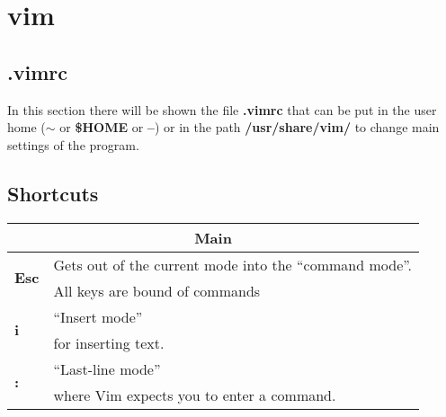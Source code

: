 \chapter{vim}
\section{.vimrc}
In this section there will be shown the file \textbf{.vimrc} that can be put in the user home (\textbf{$\sim$} or \textbf{\$HOME} or \textbf{--}) or in the path \textbf{/usr/share/vim/} to change main settings of the program.



\section{Shortcuts}

\begin{table}[h]
\centering
\footnotesize
\begin{tabular}{|l|l|}
\multicolumn{2}{c}{\textbf{Main}}\\
\hline
\multirow{2}{*}{\textbf{Esc}} & {Gets out of the current mode into the “command mode”.}\\
& {All keys are bound of commands}\\
\hline
\multirow{2}{*}{\textbf{i}} & {“Insert mode”}\\
& {for inserting text.}\\ 
\hline
\multirow{2}{*}{\textbf{:}} & {“Last-line mode”}\\ 
& {where Vim expects you to enter a command.}\\ 
\hline
\end{tabular}
\end{table}

